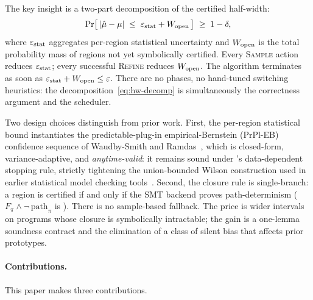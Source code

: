 The key insight is a two-part decomposition of the certified
half-width:
\begin{equation}\label{eq:hw-decomp}
  \Pr\!\big[\,|\hat{\mu} - \mu| \;\le\; \varepsilon_{\mathrm{stat}} + W_{\mathrm{open}}\,\big]
  \;\ge\; 1 - \delta,
\end{equation}
where $\varepsilon_{\mathrm{stat}}$ aggregates per-region statistical uncertainty and
$W_{\mathrm{open}}$ is the total probability mass of regions not yet
symbolically certified.  Every \textsc{Sample} action reduces
$\varepsilon_{\mathrm{stat}}$; every successful \textsc{Refine} reduces $W_{\mathrm{open}}$.  The
algorithm terminates as soon as $\varepsilon_{\mathrm{stat}} + W_{\mathrm{open}} \le \varepsilon$.
There are no phases, no hand-tuned switching heuristics: the
decomposition~\eqref{eq:hw-decomp} is simultaneously the correctness
argument and the scheduler.

Two design choices distinguish \toolname{} from prior work.  First,
the per-region statistical bound instantiates the predictable-plug-in
empirical-Bernstein (PrPl-EB) confidence sequence of Waudby-Smith and
Ramdas~\cite{waudbysmith2024betting}, which is closed-form,
variance-adaptive, and \emph{anytime-valid}: it remains sound under
\toolname{}'s data-dependent stopping rule, strictly tightening the
union-bounded Wilson construction used in earlier statistical model
checking
tools~\cite{boyer2013plasma,hartmanns2014modest}.  Second, the
closure rule is single-branch: a region is certified if and only if
the SMT backend proves path-determinism ($F_\pi \wedge
\neg\,\text{path}_\pi$ is \unsat{}).  There is no sample-based
fallback.  The price is wider intervals on programs whose closure is
symbolically intractable; the gain is a one-lemma soundness contract
and the elimination of a class of silent bias that affects prior
prototypes.

\paragraph{Contributions.}
This paper makes three contributions.

